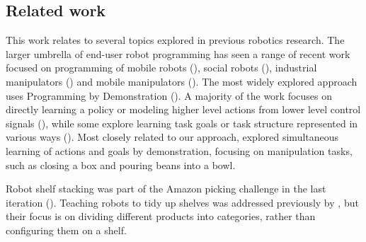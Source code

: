 \subsection{Related work}\label{sec:irosrelatedwork}
This work relates to several topics explored in previous robotics research.
The larger umbrella of end-user robot programming has seen a range of recent work focused on programming of mobile robots (\cite{huang2016design}), social robots (\cite{barakova2013end,glas2012interaction,glas2016human}), industrial manipulators (\cite{stenmark2017simplified}) and mobile manipulators (\cite{alexandrova2015roboflow,huang2017code3}).
The most widely explored approach uses Programming by Demonstration ().
A majority of the work focuses on directly learning a policy or modeling higher level actions from lower level control signals (\cite{schaal03,calinon09,akgun12klfd,schulmanlearning}), while some explore learning task goals or task structure represented in various ways (\cite{mohseni2015interactive,pardowitz2007incremental,ekvall2008robot,niekum2013incremental,jansen2006model}).
Most closely related to our approach, \cite{akgun2016simultaneously} explored simultaneous learning of actions and goals by demonstration, focusing on manipulation tasks, such as closing a box and pouring beans into a bowl.

Robot shelf stacking was part of the Amazon picking challenge in the last iteration (\cite{correll2016analysis}). 
Teaching robots to tidy up shelves was addressed previously by \cite{abdo2015robot}, but their focus is on dividing different products into categories, rather than configuring them on a shelf. 


